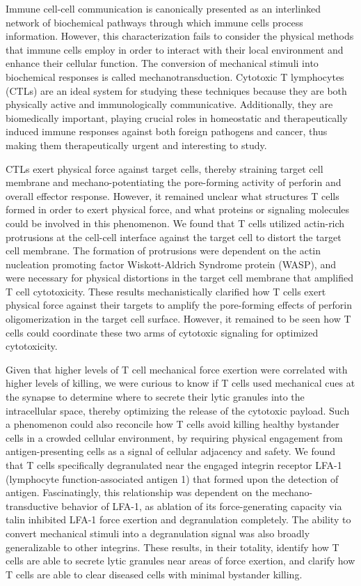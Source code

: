 Immune cell-cell communication is canonically presented as an interlinked network of biochemical pathways through which immune cells process information. However, this characterization fails to consider the physical methods that immune cells employ in order to interact with their local environment and enhance their cellular function. The conversion of mechanical stimuli into biochemical responses is called mechanotransduction. Cytotoxic T lymphocytes (CTLs) are an ideal system for studying these techniques because they are both physically active and immunologically communicative. Additionally, they are biomedically important, playing crucial roles in homeostatic and therapeutically induced immune responses against both foreign pathogens and cancer, thus making them therapeutically urgent and interesting to study.

CTLs exert physical force against target cells, thereby straining target cell membrane and mechano-potentiating the pore-forming activity of perforin and overall effector response. However, it remained unclear what structures T cells formed in order to exert physical force, and what proteins or signaling molecules could be involved in this phenomenon. We found that T cells utilized actin-rich protrusions at the cell-cell interface against the target cell to distort the target cell membrane. The formation of protrusions were dependent on the actin nucleation promoting factor Wiskott-Aldrich Syndrome protein (WASP), and were necessary for physical distortions in the target cell membrane that amplified T cell cytotoxicity. These results mechanistically clarified how T cells exert physical force against their targets to amplify the pore-forming effects of perforin oligomerization in the target cell surface. However, it remained to be seen how T cells could coordinate these two arms of cytotoxic signaling for optimized cytotoxicity.

Given that higher levels of T cell mechanical force exertion were correlated with higher levels of killing, we were curious to know if T cells used mechanical cues at the synapse to determine where to secrete their lytic granules into the intracellular space, thereby optimizing the release of the cytotoxic payload. Such a phenomenon could also reconcile how T cells avoid killing healthy bystander cells in a crowded cellular environment, by requiring physical engagement from antigen-presenting cells as a signal of cellular adjacency and safety. We found that T cells specifically degranulated near the engaged integrin receptor LFA-1 (lymphocyte function-associated antigen 1) that formed upon the detection of antigen. Fascinatingly, this relationship was dependent on the mechano-transductive behavior of LFA-1, as ablation of its force-generating capacity via talin inhibited LFA-1 force exertion and degranulation completely. The ability to convert mechanical stimuli into a degranulation signal was also broadly generalizable to other integrins. These results, in their totality, identify how T cells are able to secrete lytic granules near areas of force exertion, and clarify how T cells are able to clear diseased cells with minimal bystander killing.

